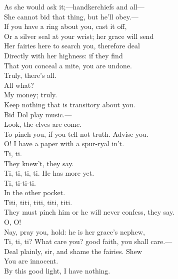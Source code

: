 \documentclass[a4paper,oneside]{memoir}
\begin{document}
\begin{drama*}
As she would ask it;---handkerchiefs and all---\\
She cannot bid that thing, but he'll obey.---\\
If you have a ring about you, cast it off,\\
Or a silver seal at your wrist; her grace will send\\
Her fairies here to search you, therefore deal\\
Directly with her highness: if they find\\
That you conceal a mite, you are undone.\\
\dapperspeaks Truly, there's all.\\
\facespeaks {} All what?\\
\dapperspeaks {} My money; truly.\\
\facespeaks Keep nothing that is transitory about you.\\
Bid Dol play music.---\\
Look, the elves are come.\\
To pinch you, if you tell not truth. Advise you.\\
\dapperspeaks O! I have a paper with a spur-ryal in't.\\
\facespeaks Ti, ti.\\
They knew't, they say.\\
\subtlespeaks {} Ti, ti, ti, ti. He has more yet.\\
\facespeaks Ti, ti-ti-ti.\\
In the other pocket.\\
\subtlespeaks {} Titi, titi, titi, titi, titi.\\
They must pinch him or he will never confess, they say.\\
\dapperspeaks O, O!\\
\facespeaks {} Nay, pray you, hold: he is her grace's nephew,\\
Ti, ti, ti? What care you? good faith, you shall care.---\\
Deal plainly, sir, and shame the fairies. Shew\\
You are innocent.\\
\dapperspeaks {} By this good light, I have nothing.\\

\end{drama*}
\end{document}
